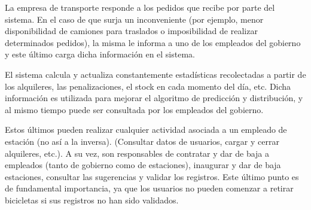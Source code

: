 La empresa de transporte responde a los pedidos que recibe por parte del sistema. En el caso de que surja un inconveniente (por ejemplo, menor disponibilidad de camiones para traslados o imposibilidad de realizar
determinados pedidos), la misma le informa a uno de los empleados del gobierno y este último carga dicha información en el sistema. 
 
El sistema calcula y actualiza constantemente estadísticas recolectadas a partir de los alquileres, las penalizaciones, el stock en cada momento del día, etc. Dicha información es utilizada para mejorar
el algoritmo de predicción y distribución, y al mismo tiempo puede ser consultada por los empleados del gobierno.

Estos últimos pueden realizar cualquier actividad asociada a un empleado de estación (no así a la inversa). (Consultar datos de usuarios, cargar y cerrar alquileres, etc.). A su vez, son responsables
de contratar y dar de baja a empleados (tanto de gobierno como de estaciones), inaugurar y dar de baja estaciones, consultar las sugerencias y validar los registros. 
Este último punto es de fundamental importancia, ya que los usuarios no pueden comenzar a retirar bicicletas si sus registros no han sido validados. 
